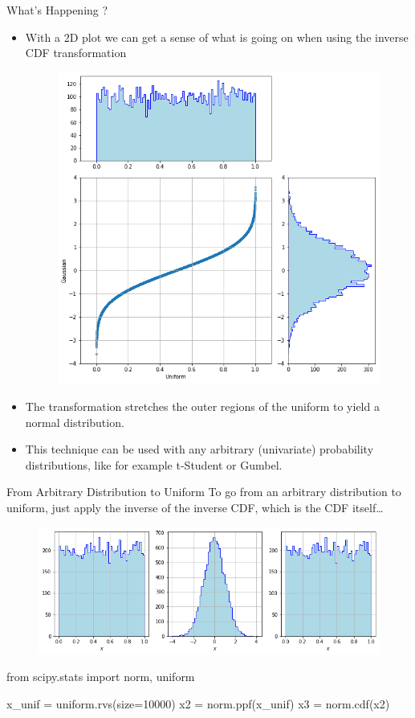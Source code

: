 \documentclass{beamer}
\begin{document}
\begin{frame}{What's Happening ?}
  \begin{itemize}
  \item With a 2D plot we can get a sense of what is going on when using the inverse CDF transformation
    \begin{figure}[h]
      \begin{center}
        \includegraphics[width=0.4\linewidth]{uniform_to_gauss_2d}
      \end{center}
    \end{figure}    
  \item The transformation stretches the outer regions of the uniform to yield a normal distribution. 
  \item This technique can be used with any arbitrary (univariate) probability distributions, like for example t-Student or Gumbel.
  \end{itemize}
\end{frame}

\begin{frame}[fragile]{From Arbitrary Distribution to Uniform}
  To go from an arbitrary distribution to uniform, just apply the inverse of the inverse CDF, which is the CDF itself\ldots
  \begin{figure}[h]
    \begin{center}
      \includegraphics[width=0.7\linewidth]{full_chain}
    \end{center}
  \end{figure}
  \begin{ipython}
from scipy.stats import norm, uniform

x_unif = uniform.rvs(size=10000)
x2 = norm.ppf(x_unif)
x3 = norm.cdf(x2)
\end{ipython} 
\end{frame}
\end{document}
